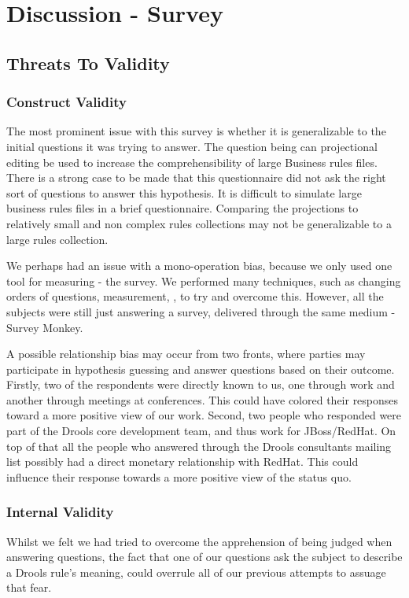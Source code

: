 \section{Discussion - Survey}

\subsection{Threats To Validity}  

\subsubsection{Construct Validity}
The most prominent issue with this survey is whether it is generalizable to the initial questions it was trying to answer.
The question being can projectional editing be used to increase the comprehensibility of large Business rules files.
There is a strong case to be made that this questionnaire did not ask the right sort of questions to answer this hypothesis.
It is difficult to simulate large business rules files in a brief questionnaire.
Comparing the projections to relatively small and non complex rules collections may not be generalizable to a large rules collection.

We perhaps had an issue with a mono-operation bias, because we only used one tool for measuring - the survey.
We performed many techniques, such as changing orders of questions, measurement,  , to try and overcome this.
However, all the subjects were still just answering a survey, delivered through the same medium - Survey Monkey.

A possible relationship bias may occur from two fronts, where parties may participate in hypothesis guessing and answer questions based on their outcome.
Firstly, two of the respondents were directly known to us, one through work and another through meetings at conferences.
This could have colored their responses toward a more positive view of our work.
Second, two people who responded were part of the Drools core development team, and thus work for JBoss/RedHat.
On top of that all the people who answered through the Drools consultants mailing list possibly had a direct monetary relationship with RedHat.
This could influence their response towards a more positive view of the status quo.

\subsubsection{Internal Validity}
Whilst we felt we had tried to overcome the apprehension of being judged when answering questions, the fact that one of our questions ask the subject to describe a Drools rule's meaning, could overrule all of our previous attempts to assuage that fear.

